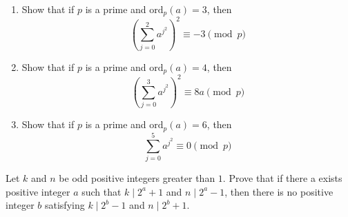 \documentclass{subfile}
\begin{document}

	\begin{problem}
		$ $
		\begin{enumerate}
			\item Show that if $p$ is a prime and $\text{ord}_p(a)=3$, then \[\left(\sum_{j=0}^{2}a^{j^{2}}\right)^{2}\equiv{-3}\pmod{p}\]

			\item Show that if $p$ is a prime and $\text{ord}_p(a)=4$, then \[\left(\sum_{j=0}^{3}a^{j^{2}}\right)^{2}\equiv{8a}\pmod{p}\]

			\item Show that if $p$ is a prime and $\text{ord}_p(a)=6$, then \[\sum_{j=0}^{5}a^{j^{2}}\equiv{0}\pmod{p}\]
		\end{enumerate}
	\end{problem}


	\begin{problem}[Poland 2016]
		Let $k$ and $n$ be odd positive integers greater than $1$. Prove that if there a exists positive integer $a$ such that $k \mid 2^a+1$ and $n \mid 2^a-1$, then there is no positive integer $b$ satisfying $k \mid 2^b-1$ and  $n \mid 2^b+1$. %
	\end{problem}
\end{document}
